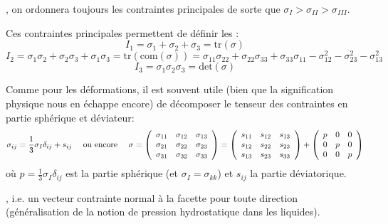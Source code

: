 , on ordonnera toujours les contraintes principales de sorte que 
$\sigma_I > \sigma_{II} > \sigma_{III}$.

\medskip
Ces contraintes principales permettent de définir les :
\begin{equation} I_1 = \sigma_1 + \sigma_2 + \sigma_3 = \mathrm{tr}(\sigma) \end{equation}
\begin{equation} I_2 = \sigma_1 \sigma_2 + \sigma_2 \sigma_3 + \sigma_1 \sigma_3 = \mathrm{tr}(\mathrm{com}(\sigma)) = \sigma_{11}\sigma_{22} + \sigma_{22}\sigma_{33} + \sigma_{33}\sigma_{11} -\sigma_{12}^2 - \sigma_{23}^2 - \sigma_{13}^2 \end{equation}
\begin{equation} I_3 = \sigma_1 \sigma_2 \sigma_3 = \mathrm{det}(\sigma) \end{equation}

\medskip
Comme pour les déformations, il est souvent utile (bien que la signification physique nous en échappe 
encore) de décomposer le tenseur des contraintes en partie sphérique et déviateur:
\begin{equation} \sigma_{ij} = \frac13\sigma_I\delta_{ij}+s_{ij} 
\quad \text{ ou encore } \quad
\sigma =
\left( \begin{array}{ccc} \sigma_{11}&\sigma_{12}&\sigma_{13}\\ \sigma_{21}&\sigma_{22}&\sigma_{23}\\
\sigma_{31}&\sigma_{32}&\sigma_{33}\end{array}\right)
=
\left( \begin{array}{ccc} s_{11}&s_{12}&s_{13}\\ s_{12}&s_{22}&s_{23}\\
s_{13}&s_{23}&s_{33}\end{array}\right)
+\left( \begin{array}{ccc} p&0&0\\0&p&0\\0&0&p\end{array}\right)
\end{equation}
où $p=\frac13\sigma_I\delta_{ij}$ est la partie sphérique (et $\sigma_I=\sigma_{kk}$)
et $s_{ij}$ la partie déviatorique.

\medskip
{}, i.e. un vecteur 
contrainte normal à la facette pour toute direction (généralisation de la notion de pression 
hydrostatique dans les liquides).

